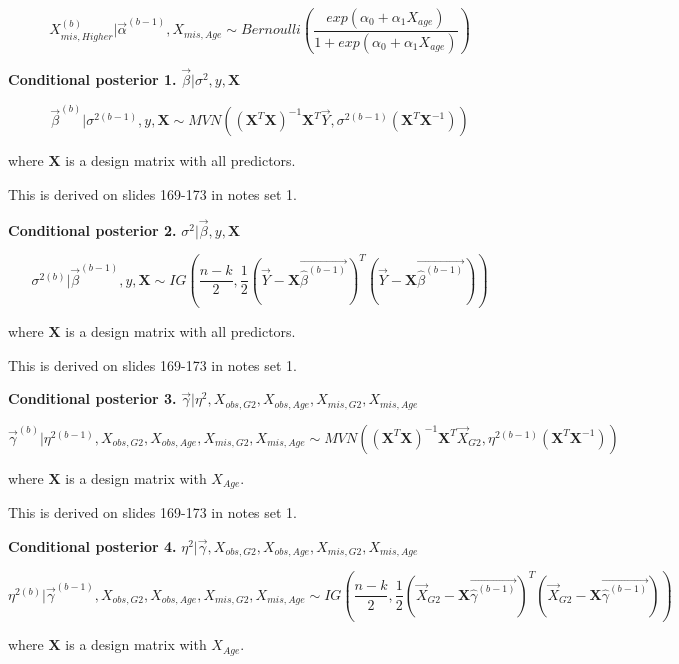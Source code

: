 \documentclass[11pt]{article}
\begin{document}
$$X_{mis, Higher}^{(b)}|\vec\alpha^{(b - 1)}, X_{mis, Age} \sim Bernoulli\left(\frac{exp(\alpha_0 + \alpha_1X_{age})}{1 + exp(\alpha_0 + \alpha_1X_{age})}\right)$$

\textbf{Conditional posterior 1.} $\vec\beta | \sigma^2, y, \mathbf{X}$

$$\vec\beta^{(b)} | \sigma^{2(b - 1)}, y, \mathbf{X} \sim MVN((\mathbf{X}^T\mathbf{X})^{-1}\mathbf{X}^T\vec{Y}, \sigma^{2(b - 1)}(\mathbf{X}^T\mathbf{X}^{-1}))$$

where $\mathbf{X}$ is a design matrix with all predictors.

This is derived on slides 169-173 in notes set 1.

\vspace{0.25in}

\textbf{Conditional posterior 2.} $\sigma^2 | \vec\beta, y, \mathbf{X}$

$$\sigma^{2(b)} | \vec\beta^{(b - 1)}, y, \mathbf{X} \sim IG\left(\frac{n - k}{2}, \frac{1}{2}(\vec{Y} - \mathbf{X}\vec{\hat\beta^{(b - 1)}})^T(\vec{Y} - \mathbf{X}\vec{\hat\beta^{(b - 1)}})\right)$$

where $\mathbf{X}$ is a design matrix with all predictors.

This is derived on slides 169-173 in notes set 1.

\vspace{0.25in}

\textbf{Conditional posterior 3.} $\vec{\gamma}|\eta^2, X_{obs, G2}, X_{obs, Age}, X_{mis, G2}, X_{mis, Age}$

$$\vec{\gamma}^{(b)}|\eta^{2(b - 1)}, X_{obs, G2}, X_{obs, Age}, X_{mis, G2}, X_{mis, Age} \sim MVN((\mathbf{X}^T\mathbf{X})^{-1}\mathbf{X}^T\vec{X}_{G2}, \eta^{2(b - 1)}(\mathbf{X}^T\mathbf{X}^{-1}))$$

where $\mathbf{X}$ is a design matrix with $X_{Age}$.

This is derived on slides 169-173 in notes set 1.

\vspace{0.25in}

\textbf{Conditional posterior 4.} $\eta^2|\vec{\gamma}, X_{obs, G2}, X_{obs, Age}, X_{mis, G2}, X_{mis, Age}$

$$\eta^{2(b)}|\vec{\gamma}^{(b - 1)}, X_{obs, G2}, X_{obs, Age}, X_{mis, G2}, X_{mis, Age} \sim IG\left(\frac{n - k}{2}, \frac{1}{2}(\vec{X}_{G2} - \mathbf{X}\vec{\hat\gamma^{(b - 1)}})^T(\vec{X}_{G2} - \mathbf{X}\vec{\hat\gamma^{(b - 1)}})\right)$$

where $\mathbf{X}$ is a design matrix with $X_{Age}$.
\end{document}
